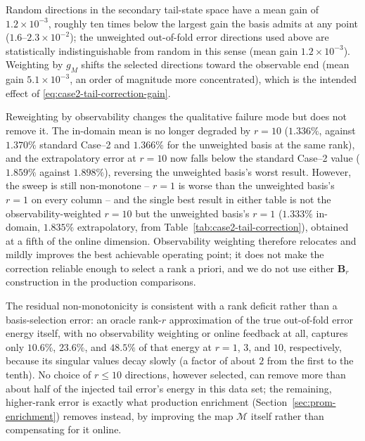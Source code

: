 \documentclass[11pt]{article}
\begin{document}
Random directions in the secondary tail-state space have a mean gain of
\(1.2\times10^{-3}\), roughly ten times below the largest gain the basis
admits at any point (\(1.6\)--\(2.3\times10^{-2}\)); the unweighted
out-of-fold error directions used above are statistically indistinguishable
from random in this sense (mean gain \(1.2\times10^{-3}\)).  Weighting by
\(g_M\) shifts the selected directions toward the observable end (mean gain
\(5.1\times10^{-3}\), an order of magnitude more concentrated), which is the
intended effect of \eqref{eq:case2-tail-correction-gain}.

\begin{table}[H]
\centering
\caption{Observability-weighted low-rank secondary-tail correction
diagnostic for baseline Case--2, same metric and columns as
Table~\ref{tab:case2-tail-correction}.}
\label{tab:case2-tail-correction-obsweighted}

\end{table}

Reweighting by observability changes the qualitative failure mode but does
not remove it.  The in-domain mean is no longer degraded by \(r=10\)
(\(1.336\%\), against \(1.370\%\) standard Case--2 and \(1.366\%\) for the
unweighted basis at the same rank), and the extrapolatory error at \(r=10\)
now falls below the standard Case--2 value (\(1.859\%\) against
\(1.898\%\)), reversing the unweighted basis's worst result.  However, the
sweep is still non-monotone -- \(r=1\) is worse than the unweighted basis's
\(r=1\) on every column -- and the single best result in either table is not
the observability-weighted \(r=10\) but the unweighted basis's \(r=1\)
(\(1.333\%\) in-domain, \(1.835\%\) extrapolatory, from
Table~\ref{tab:case2-tail-correction}), obtained at a fifth of the online
dimension.  Observability weighting therefore relocates and mildly improves
the best achievable operating point; it does not make the correction
reliable enough to select a rank a priori, and we do not use either
\(\mathbf B_r\) construction in the production comparisons.

The residual non-monotonicity is consistent with a rank deficit rather than
a basis-selection error: an oracle rank-\(r\) approximation of the true
out-of-fold error energy itself, with no observability weighting or online
feedback at all, captures only \(10.6\%\), \(23.6\%\), and \(48.5\%\) of that
energy at \(r=1\), \(3\), and \(10\), respectively, because its singular
values decay slowly (a factor of about \(2\) from the first to the tenth).
No choice of \(r\le10\) directions, however selected, can remove more than
about half of the injected tail error's energy in this data set; the
remaining, higher-rank error is exactly what production enrichment
(Section~\ref{sec:prom-enrichment}) removes instead, by improving the map
\(\mathcal M\) itself rather than compensating for it online.
\end{document}

